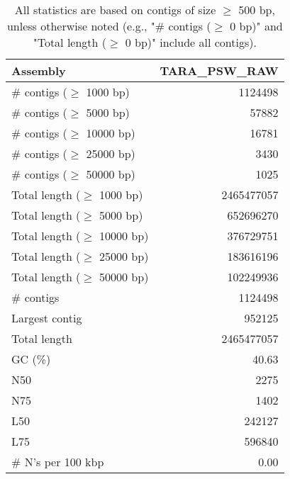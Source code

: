 \documentclass[12pt,a4paper]{article}
\begin{document}
\begin{table}[ht]
\begin{center}
\caption{All statistics are based on contigs of size $\geq$ 500 bp, unless otherwise noted (e.g., "\# contigs ($\geq$ 0 bp)" and "Total length ($\geq$ 0 bp)" include all contigs).}
\begin{tabular}{|l*{1}{|r}|}
\hline
Assembly & TARA\_PSW\_RAW \\ \hline
\# contigs ($\geq$ 1000 bp) & 1124498 \\ \hline
\# contigs ($\geq$ 5000 bp) & 57882 \\ \hline
\# contigs ($\geq$ 10000 bp) & 16781 \\ \hline
\# contigs ($\geq$ 25000 bp) & 3430 \\ \hline
\# contigs ($\geq$ 50000 bp) & 1025 \\ \hline
Total length ($\geq$ 1000 bp) & 2465477057 \\ \hline
Total length ($\geq$ 5000 bp) & 652696270 \\ \hline
Total length ($\geq$ 10000 bp) & 376729751 \\ \hline
Total length ($\geq$ 25000 bp) & 183616196 \\ \hline
Total length ($\geq$ 50000 bp) & 102249936 \\ \hline
\# contigs & 1124498 \\ \hline
Largest contig & 952125 \\ \hline
Total length & 2465477057 \\ \hline
GC (\%) & 40.63 \\ \hline
N50 & 2275 \\ \hline
N75 & 1402 \\ \hline
L50 & 242127 \\ \hline
L75 & 596840 \\ \hline
\# N's per 100 kbp & 0.00 \\ \hline
\end{tabular}
\end{center}
\end{table}
\end{document}
